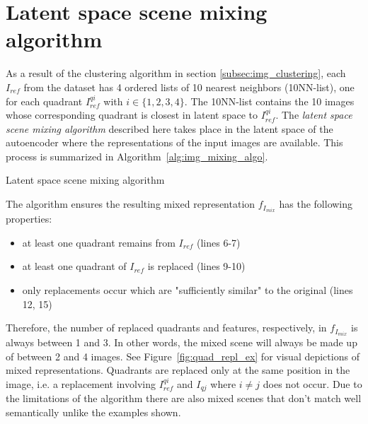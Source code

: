 \documentclass[a4paper,12pt]{report}
\begin{document}
\section{Latent space scene mixing algorithm} \label{subsec:img_mixing_algo}
As a result of the clustering algorithm in section \ref{subsec:img_clustering}, each $I_{ref}$ from the dataset has 4 ordered lists of 10 nearest neighbors (10NN-list), one for each quadrant $I^{qi}_{ref}$ with $i \in \{1,2,3,4\}$. The 10NN-list contains the 10 images whose corresponding quadrant is closest in latent space to $I^{qi}_{ref}$. The \textit{latent space scene mixing algorithm} described here takes place in the latent space of the autoencoder where the representations of the input images are available. This process is summarized in Algorithm~\ref{alg:img_mixing_algo}. 

\begin{algorithm}[H]
\DontPrintSemicolon
\LinesNumbered
{}
\caption{Latent space scene mixing algorithm}\label{alg:img_mixing_algo}
\end{algorithm}

The algorithm ensures the resulting mixed representation $f_{I_{mix}}$ has the following properties:
\begin{itemize}
   \item at least one quadrant remains from $I_{ref}$ (lines 6-7)
   \item at least one quadrant of $I_{ref}$ is replaced (lines 9-10)
   \item only replacements occur which are "sufficiently similar" to the original (lines 12, 15)
\end{itemize}
Therefore, the number of replaced quadrants and features, respectively, in $f_{I_{mix}}$ is always between 1 and 3. In other words, the mixed scene will always be made up of between 2 and 4 images. See Figure~\ref{fig:quad_repl_ex} for visual depictions of mixed representations. Quadrants are replaced only at the same position in the image, i.e. a replacement involving $I^{qi}_{ref}$ and $I_{qj}$ where $i \neq j$ does not occur. Due to the limitations of the algorithm there are also mixed scenes that don't match well semantically unlike the examples shown.

\end{document}
